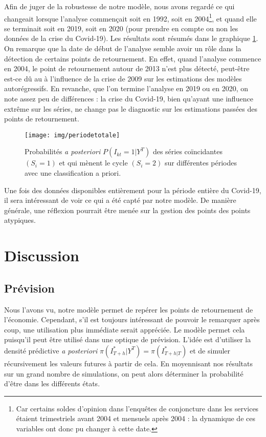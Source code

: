 \documentclass[10pt,french,french]{article}
\let\rmarkdownfootnote\footnote%
\def\footnote{\protect\rmarkdownfootnote}
\begin{document}
Afin de juger de la robustesse de notre modèle, nous avons regardé ce qui changeait lorsque l'analyse commençait soit en 1992, soit en 2004\footnote{Car certains soldes d'opinion dans l'enquêtes de conjoncture dans les services étaient trimestriels avant 2004 et mensuels après 2004 : la dynamique de ces variables ont donc pu changer à cette date.}, et quand elle se terminait soit en 2019, soit en 2020 (pour prendre en compte ou non les données de la crise du Covid-19). Les résultats sont résumés dans le graphique \ref{fig:impactdate}.
On remarque que la date de début de l'analyse semble avoir un rôle dans la détection de certains points de retournement. En effet, quand l'analyse commence en 2004, le point de retournement autour de 2013 n'est plus détecté, peut-être est-ce dû au à l'influence de la crise de 2009 sur les estimations des modèles autorégressifs.
En revanche, que l'on termine l'analyse en 2019 ou en 2020, on note assez peu de différences : la crise du Covid-19, bien qu'ayant une influence extrême sur les séries, ne change pas le diagnostic sur les estimations passées des points de retournement.

\begin{figure}[h]
{\centering
\texttt{[image: img/periodetotale]}
\caption{Probabilités \textit{a posteriori} $P(I_{kt}=1|Y^T)$ des séries coïncidantes $(S_i=1)$ et qui mènent le cycle $(S_i=2)$ sur différentes périodes avec une classification a priori.}\label{fig:impactdate}}
\end{figure}

Une fois des données disponibles entièrement pour la période entière du Covid-19, il sera intéressant de voir ce qui a été capté par notre modèle.
De manière générale, une réflexion pourrait être menée sur la gestion des points des points atypiques.

\hypertarget{discussion}{%
\section{Discussion}\label{discussion}}

\hypertarget{pruxe9vision}{%
\subsection{Prévision}\label{pruxe9vision}}

Nous l'avons vu, notre modèle permet de repérer les points de retournement de l'économie.
Cependant, s'il est toujours intéressant de pouvoir le remarquer après coup, une utilisation plus immédiate serait appréciée.
Le modèle permet cela puisqu'il peut être utilisé dans une optique de prévision.
L'idée est d'utiliser la densité prédictive \emph{a posteriori} \(\pi(I^*_{T+h}|Y^T) = \pi(I^*_{T+h|T})\) et de simuler récursivement les valeurs futures à partir de cela.
En moyennisant nos résultats sur un grand nombre de simulations, on peut alors déterminer la probabilité d'être dans les différents états.
\end{document}
